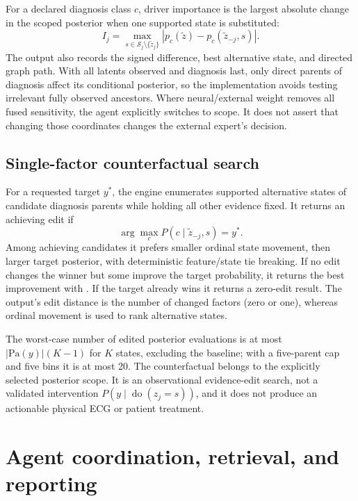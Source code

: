 \documentclass[11pt,a4paper]{article}
\newcommand{\code}[1]{\texttt{\detokenize{#1}}}
\begin{document}
For a declared diagnosis class $c$, driver importance is the largest absolute change in the scoped posterior when one supported state is substituted:
\begin{equation}
I_j=\max_{s\in\mathcal{S}_j\setminus\{\tilde z_j\}}
\left|p_c(\tilde z)-p_c(\tilde z_{-j},s)\right|.
\end{equation}
The output also records the signed difference, best alternative state, and directed graph path. With all latents observed and diagnosis last, only direct parents of diagnosis affect its conditional posterior, so the implementation avoids testing irrelevant fully observed ancestors. Where neural/external weight removes all fused sensitivity, the agent explicitly switches to \code{bayesian_component} scope. It does not assert that changing those coordinates changes the external expert's decision.

\subsection{Single-factor counterfactual search}
For a requested target $y^*$, the engine enumerates supported alternative states of candidate diagnosis parents while holding all other evidence fixed. It returns an achieving edit if
\begin{equation}
\arg\max_c P(c\mid \tilde z_{-j},s)=y^*.
\end{equation}
Among achieving candidates it prefers smaller ordinal state movement, then larger target posterior, with deterministic feature/state tie breaking. If no edit changes the winner but some improve the target probability, it returns the best improvement with \code{found=false}. If the target already wins it returns a zero-edit result. The output's edit distance is the number of changed factors (zero or one), whereas ordinal movement is used to rank alternative states.

The worst-case number of edited posterior evaluations is at most $|\mathrm{Pa}(y)|(K-1)$ for $K$ states, excluding the baseline; with a five-parent cap and five bins it is at most 20. The counterfactual belongs to the explicitly selected posterior scope. It is an observational evidence-edit search, not a validated intervention $P(y\mid\operatorname{do}(z_j=s))$, and it does not produce an actionable physical ECG or patient treatment.

\section{Agent coordination, retrieval, and reporting}
\label{sec:agents}
\end{document}
